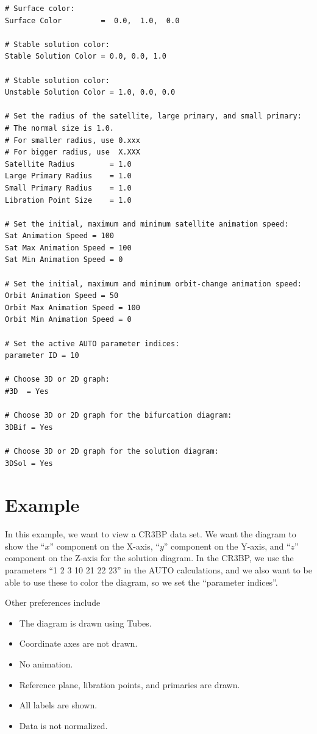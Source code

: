 {\begin{verbatim}
# Surface color:
Surface Color         =  0.0,  1.0,  0.0

# Stable solution color:
Stable Solution Color = 0.0, 0.0, 1.0

# Stable solution color:
Unstable Solution Color = 1.0, 0.0, 0.0

# Set the radius of the satellite, large primary, and small primary:
# The normal size is 1.0.
# For smaller radius, use 0.xxx
# For bigger radius, use  X.XXX
Satellite Radius        = 1.0
Large Primary Radius    = 1.0
Small Primary Radius    = 1.0
Libration Point Size    = 1.0

# Set the initial, maximum and minimum satellite animation speed:
Sat Animation Speed = 100
Sat Max Animation Speed = 100
Sat Min Animation Speed = 0

# Set the initial, maximum and minimum orbit-change animation speed:
Orbit Animation Speed = 50
Orbit Max Animation Speed = 100
Orbit Min Animation Speed = 0

# Set the active AUTO parameter indices:
parameter ID = 10

# Choose 3D or 2D graph:
#3D  = Yes 

# Choose 3D or 2D graph for the bifurcation diagram:
3DBif = Yes

# Choose 3D or 2D graph for the solution diagram:
3DSol = Yes

\end{verbatim}
}

\section{Example}

In this example, we want to view a CR3BP data set.
We want the diagram to show the ``$x$'' component on the X-axis, ``$y$'' component on the Y-axis, and ``$z$'' component on the Z-axis
for the solution diagram. 
In the CR3BP, we use the parameters ``1 2 3 10 21 22 23'' in the AUTO  
calculations, and we also want to be able to use these to color the diagram, so we set the ``parameter indices''.  

Other preferences include
\begin{itemize}
\item The diagram is drawn using Tubes.
\item Coordinate axes are not drawn.
\item No animation.
\item Reference plane, libration points, and primaries are drawn.
\item All labels are shown.
\item Data is not normalized. 
\end{itemize}

